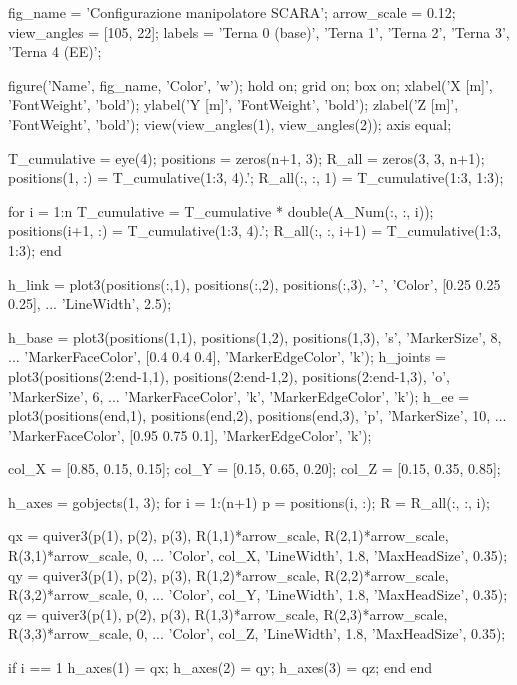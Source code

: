\documentclass[11pt, a4paper]{article}
\begin{document}
\begin{matlabcode}
fig_name    = 'Configurazione manipolatore SCARA';
arrow_scale = 0.12;
view_angles = [105, 22];
labels      = {'Terna 0 (base)', 'Terna 1', 'Terna 2', 'Terna 3', 'Terna 4 (EE)'};

figure('Name', fig_name, 'Color', 'w');
hold on;
grid on;
box on;
xlabel('X [m]', 'FontWeight', 'bold');
ylabel('Y [m]', 'FontWeight', 'bold');
zlabel('Z [m]', 'FontWeight', 'bold');
view(view_angles(1), view_angles(2));
axis equal;

T_cumulative = eye(4);
positions = zeros(n+1, 3);
R_all     = zeros(3, 3, n+1);
positions(1, :) = T_cumulative(1:3, 4).';
R_all(:, :, 1)  = T_cumulative(1:3, 1:3);

for i = 1:n
    T_cumulative = T_cumulative * double(A_Num(:, :, i));
    positions(i+1, :) = T_cumulative(1:3, 4).';
    R_all(:, :, i+1)  = T_cumulative(1:3, 1:3);
end

h_link = plot3(positions(:,1), positions(:,2), positions(:,3), '-', 'Color', [0.25 0.25 0.25], ...
    'LineWidth', 2.5);

h_base = plot3(positions(1,1), positions(1,2), positions(1,3), 's', 'MarkerSize', 8, ...
    'MarkerFaceColor', [0.4 0.4 0.4], 'MarkerEdgeColor', 'k');
h_joints = plot3(positions(2:end-1,1), positions(2:end-1,2), positions(2:end-1,3), 'o', 'MarkerSize', 6, ...
    'MarkerFaceColor', 'k', 'MarkerEdgeColor', 'k');
h_ee = plot3(positions(end,1), positions(end,2), positions(end,3), 'p', 'MarkerSize', 10, ...
     'MarkerFaceColor', [0.95 0.75 0.1], 'MarkerEdgeColor', 'k');

col_X = [0.85, 0.15, 0.15];
col_Y = [0.15, 0.65, 0.20];
col_Z = [0.15, 0.35, 0.85];

h_axes = gobjects(1, 3);
for i = 1:(n+1)
    p = positions(i, :);
    R = R_all(:, :, i);

    qx = quiver3(p(1), p(2), p(3), R(1,1)*arrow_scale, R(2,1)*arrow_scale, R(3,1)*arrow_scale, 0, ...
        'Color', col_X, 'LineWidth', 1.8, 'MaxHeadSize', 0.35);
    qy = quiver3(p(1), p(2), p(3), R(1,2)*arrow_scale, R(2,2)*arrow_scale, R(3,2)*arrow_scale, 0, ...
        'Color', col_Y, 'LineWidth', 1.8, 'MaxHeadSize', 0.35);
    qz = quiver3(p(1), p(2), p(3), R(1,3)*arrow_scale, R(2,3)*arrow_scale, R(3,3)*arrow_scale, 0, ...
        'Color', col_Z, 'LineWidth', 1.8, 'MaxHeadSize', 0.35);

    if i == 1
        h_axes(1) = qx;
        h_axes(2) = qy;
        h_axes(3) = qz;
    end
end
\end{matlabcode}
\end{document}
